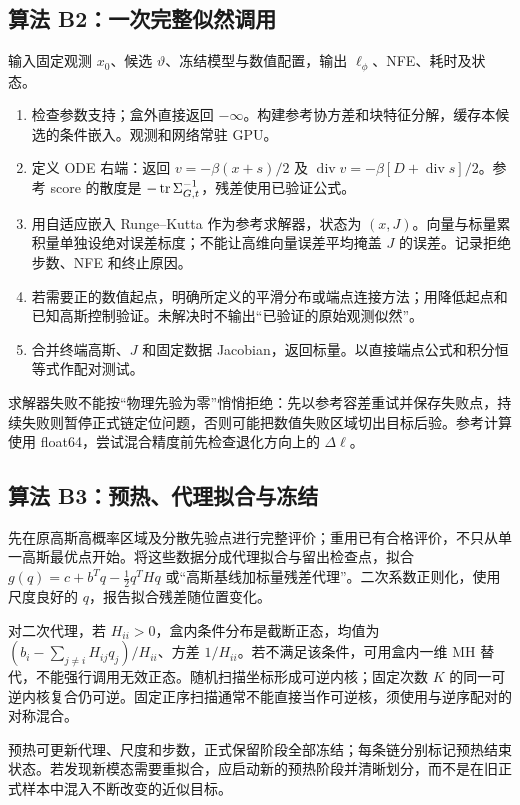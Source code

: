 \documentclass[UTF8,fontset=none,a4paper,11pt]{ctexart}
\begin{document}
\subsection{算法 B2：一次完整似然调用}
输入固定观测 $x_0$、候选 $\vartheta$、冻结模型与数值配置，输出 $\ell_\phi$、NFE、耗时及状态。
\begin{enumerate}
\item 检查参数支持；盒外直接返回 $-\infty$。构建参考协方差和块特征分解，缓存本候选的条件嵌入。观测和网络常驻 GPU。
\item 定义 ODE 右端：返回 $v=-\beta(x+s)/2$ 及 $\operatorname{div}v=-\beta[D+\operatorname{div}s]/2$。参考 score 的散度是 $-\operatorname{tr}\Sigma_{G,t}^{-1}$，残差使用已验证公式。
\item 用自适应嵌入 Runge--Kutta 作为参考求解器，状态为 $(x,J)$。向量与标量累积量单独设绝对误差标度；不能让高维向量误差平均掩盖 $J$ 的误差。记录拒绝步数、NFE 和终止原因。
\item 若需要正的数值起点，明确所定义的平滑分布或端点连接方法；用降低起点和已知高斯控制验证。未解决时不输出“已验证的原始观测似然”。
\item 合并终端高斯、$J$ 和固定数据 Jacobian，返回标量。以直接端点公式和积分恒等式作配对测试。
\end{enumerate}
求解器失败不能按“物理先验为零”悄悄拒绝：先以参考容差重试并保存失败点，持续失败则暂停正式链定位问题，否则可能把数值失败区域切出目标后验。参考计算使用 float64，尝试混合精度前先检查退化方向上的 $\Delta\ell$。
\subsection{算法 B3：预热、代理拟合与冻结}
先在原高斯高概率区域及分散先验点进行完整评价；重用已有合格评价，不只从单一高斯最优点开始。将这些数据分成代理拟合与留出检查点，拟合 $g(q)=c+b^Tq-\tfrac12q^THq$ 或“高斯基线加标量残差代理”。二次系数正则化，使用尺度良好的 $q$，报告拟合残差随位置变化。
\par 对二次代理，若 $H_{ii}>0$，盒内条件分布是截断正态，均值为 $(b_i-\sum_{j\ne i}H_{ij}q_j)/H_{ii}$、方差 $1/H_{ii}$。若不满足该条件，可用盒内一维 MH 替代，不能强行调用无效正态。随机扫描坐标形成可逆内核；固定次数 $K$ 的同一可逆内核复合仍可逆。固定正序扫描通常不能直接当作可逆核，须使用与逆序配对的对称混合。
\par 预热可更新代理、尺度和步数，正式保留阶段全部冻结；每条链分别标记预热结束状态。若发现新模态需要重拟合，应启动新的预热阶段并清晰划分，而不是在旧正式样本中混入不断改变的近似目标。
\end{document}

